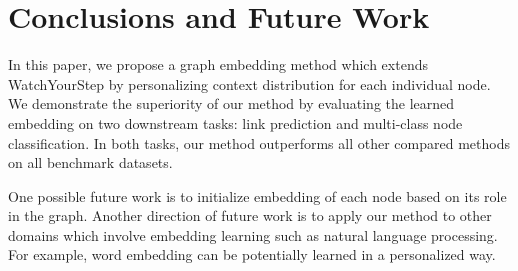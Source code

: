 \documentclass{article}
\begin{document}
\section{Conclusions and Future Work}
In this paper, we propose a graph embedding method which extends WatchYourStep by personalizing context distribution for each individual node. We demonstrate the superiority of our method by evaluating the learned embedding on two downstream tasks: link prediction and multi-class node classification. In both tasks, our method outperforms all other compared methods on all benchmark datasets. 

One possible future work is to initialize embedding of each node based on its role in the graph. Another direction of future work is to apply our method to other domains which involve embedding learning such as natural language processing. For example, word embedding can be potentially learned in a personalized way.







\end{document}

